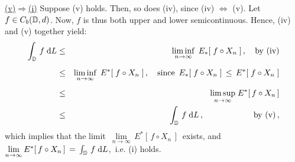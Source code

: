 \vskip 0.5cm \noindent
\underline{(v)\;$\Longrightarrow$\;(i)}
\vskip 0.2cm \noindent
Suppose (v) holds. Then, so does (iv), since (iv) $\Longleftrightarrow$ (v).
Let $f \in C_{b}(\mathbb{D},d)$. Now, $f$ is thus both upper and lower semicontinuous.
Hence, (iv) and (v) together yield:
\begin{eqnarray*}
\int_{\D}\, f \;\d L
& \leq &
	\underset{n\rightarrow\infty}{\liminf}\;\,E_{*}\!\left[\;f \circ X_{n}\;\right],
	\quad\textnormal{by (iv)}
\\
& \overset{{\color{white}+}}{\leq} &
	\underset{n\rightarrow\infty}{\liminf}\;\,E^{*}\!\left[\;f \circ X_{n}\;\right],
	\quad\textnormal{since \,$E_{*}\!\left[\;f \circ X_{n}\;\right] \,\leq\, E^{*}\!\left[\;f \circ X_{n}\;\right]$}
\\
& \overset{{\color{white}+}}{\leq} &
	\underset{n\rightarrow\infty}{\limsup}\; E^{*}\!\left[\,f \circ X_{n}\,\right] 
\\
& \leq &
	\int_{\D}\, f \;\d L\,,
	\quad\quad\quad\quad\quad\quad\textnormal{by (v)}\,,
\end{eqnarray*}
which implies that the limit
\,$\underset{n\rightarrow\infty}{\lim}\, E^{*}\!\left[\,f \circ X_{n}\,\right]$\,
exists, and
\,$\underset{n\rightarrow\infty}{\lim}\, E^{*}\!\left[\,f \circ X_{n}\,\right] \,=\, \int_{\mathbb{D}}\, f \;\textnormal{d} L$,\,
i.e. (i) holds.

